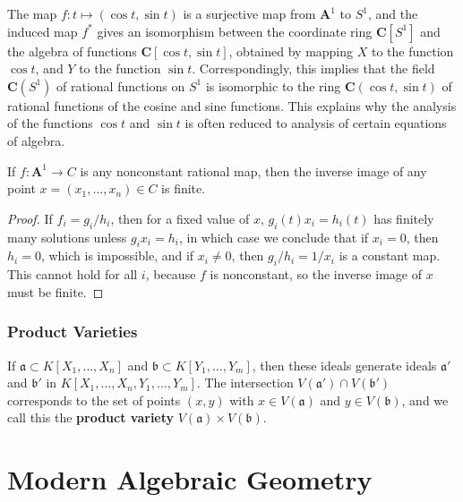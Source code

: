 \begin{example}
    The map $f: t \mapsto (\cos t, \sin t)$ is a surjective map from $\mathbf{A}^1$ to $S^1$, and the induced map $f^*$ gives an isomorphism between the coordinate ring $\mathbf{C}[S^1]$ and the algebra of functions $\mathbf{C}[\cos t, \sin t]$, obtained by mapping $X$ to the function $\cos t$, and $Y$ to the function $\sin t$. Correspondingly, this implies that the field $\mathbf{C}(S^1)$ of rational functions on $S^1$ is isomorphic to the ring $\mathbf{C}(\cos t, \sin t)$ of rational functions of the cosine and sine functions. This explains why the analysis of the functions $\cos t$ and $\sin t$ is often reduced to analysis of certain equations of algebra.
\end{example}

\begin{theorem}
    If $f: \mathbf{A}^1 \to C$ is any nonconstant rational map, then the inverse image of any point $x = (x_1, \dots, x_n) \in C$ is finite.
\end{theorem}
\begin{proof}
    If $f_i = g_i/h_i$, then for a fixed value of $x$, $g_i(t)x_i = h_i(t)$ has finitely many solutions unless $g_ix_i = h_i$, in which case we conclude that if $x_i = 0$, then $h_i = 0$, which is impossible, and if $x_i \neq 0$, then $g_i/h_i = 1/x_i$ is a constant map. This cannot hold for all $i$, because $f$ is nonconstant, so the inverse image of $x$ must be finite.
\end{proof}

\section{Product Varieties}

If $\mathfrak{a} \subset K[X_1, \dots, X_n]$ and $\mathfrak{b} \subset K[Y_1, \dots, Y_m]$, then these ideals generate ideals $\mathfrak{a}'$ and $\mathfrak{b}'$ in $K[X_1, \dots, X_n, Y_1, \dots, Y_m]$. The intersection $V(\mathfrak{a}') \cap V(\mathfrak{b}')$ corresponds to the set of points $(x,y)$ with $x \in V(\mathfrak{a})$ and $y \in V(\mathfrak{b})$, and we call this the {\bf product variety} $V(\mathfrak{a}) \times V(\mathfrak{b})$.

\part{Modern Algebraic Geometry}

